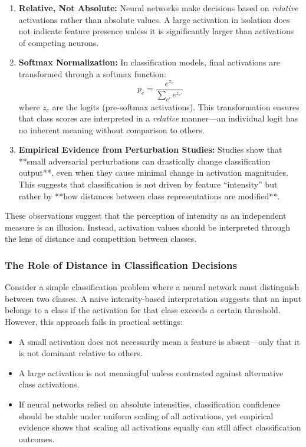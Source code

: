 \begin{enumerate}
    \item \textbf{Relative, Not Absolute:} Neural networks make decisions based on \textit{relative} activations rather than absolute values. A large activation in isolation does not indicate feature presence unless it is significantly larger than activations of competing neurons.
    \item \textbf{Softmax Normalization:} In classification models, final activations are transformed through a softmax function:
    \[
    p_c = \frac{e^{z_c}}{\sum_{c'} e^{z_{c'}}}
    \]
    where \( z_c \) are the logits (pre-softmax activations). This transformation ensures that class scores are interpreted in a \textit{relative} manner—an individual logit has no inherent meaning without comparison to others.
    \item \textbf{Empirical Evidence from Perturbation Studies:} Studies show that **small adversarial perturbations can drastically change classification output**, even when they cause minimal change in activation magnitudes. This suggests that classification is not driven by feature “intensity” but rather by **how distances between class representations are modified**.
\end{enumerate}

These observations suggest that the perception of intensity as an independent measure is an illusion. Instead, activation values should be interpreted through the lens of distance and competition between classes.

\subsubsection{The Role of Distance in Classification Decisions}

Consider a simple classification problem where a neural network must distinguish between two classes. A naive intensity-based interpretation suggests that an input belongs to a class if the activation for that class exceeds a certain threshold. However, this approach fails in practical settings:

\begin{itemize}
    \item A small activation does not necessarily mean a feature is absent—only that it is not dominant relative to others.
    \item A large activation is not meaningful unless contrasted against alternative class activations.
    \item If neural networks relied on absolute intensities, classification confidence should be stable under uniform scaling of all activations, yet empirical evidence shows that scaling all activations equally can still affect classification outcomes.
\end{itemize}

